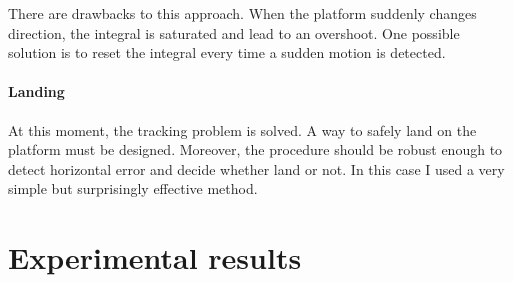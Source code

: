 There are drawbacks to this approach. When the platform suddenly changes direction, the integral is saturated and lead to an overshoot. One possible solution is to reset the integral every time a sudden motion is detected.

\paragraph{Landing}

At this moment, the tracking problem is solved. A way to safely land on the platform must be designed. Moreover, the procedure should be robust enough to detect horizontal error and decide whether land or not. In this case I used a very simple but surprisingly effective method. 





\section{Experimental results}

